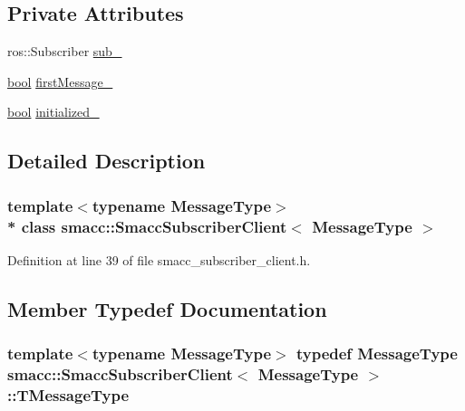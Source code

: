 \subsection*{Private Attributes}
\begin{DoxyCompactItemize}
\item 
ros\+::\+Subscriber \hyperlink{classsmacc_1_1SmaccSubscriberClient_a2a1c46e0ea0a2090a63232402b998518}{sub\+\_\+}
\item 
\hyperlink{classbool}{bool} \hyperlink{classsmacc_1_1SmaccSubscriberClient_ad7af631a0b6bdacb76a2532a06ad0a03}{first\+Message\+\_\+}
\item 
\hyperlink{classbool}{bool} \hyperlink{classsmacc_1_1SmaccSubscriberClient_a429baac945d15cb7d997c41c847f5c33}{initialized\+\_\+}
\end{DoxyCompactItemize}


\subsection{Detailed Description}
\subsubsection*{template$<$typename Message\+Type$>$\\*
class smacc\+::\+Smacc\+Subscriber\+Client$<$ Message\+Type $>$}



Definition at line 39 of file smacc\+\_\+subscriber\+\_\+client.\+h.



\subsection{Member Typedef Documentation}
\subsubsection[{\texorpdfstring{T\+Message\+Type}{TMessageType}}]{\setlength{\rightskip}{0pt plus 5cm}template$<$typename Message\+Type$>$ typedef Message\+Type {\bf smacc\+::\+Smacc\+Subscriber\+Client}$<$ Message\+Type $>$\+::{\bf T\+Message\+Type}}\hypertarget{classsmacc_1_1SmaccSubscriberClient_ae0666debefce5c0e7b355ded711ffa79}{}\label{classsmacc_1_1SmaccSubscriberClient_ae0666debefce5c0e7b355ded711ffa79}


